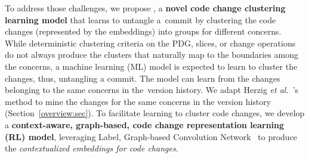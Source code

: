 



To address those challenges, we propose {\tool}, a {\bf novel code
  change clustering learning model} that learns to untangle a~commit
by clustering the code changes (represented by the embeddings) into
groups for different concerns.
%
While deterministic clustering criteria on the PDG, slices, or change
operations do not always produce the clusters that naturally map to
the boundaries among the concerns, a machine learning (ML) model is
expected to learn to cluster the changes, thus, untangling a
commit. The model can learn from the changes belonging to the same
concerns in the~version history. We adapt Herzig {\em et
  al.}~\cite{kim-emse16}'s method to mine the changes for the same
concerns in the version history (Section~\ref{overview:sec}).
%
To facilitate learning to cluster code changes, we develop a {\bf
  context-aware, graph-based, code change representation learning (RL)
  model}, leveraging Label, Graph-based Convolution
Network~\cite{label-gcn} to produce the {\em contextualized embeddings
  for code changes}.

